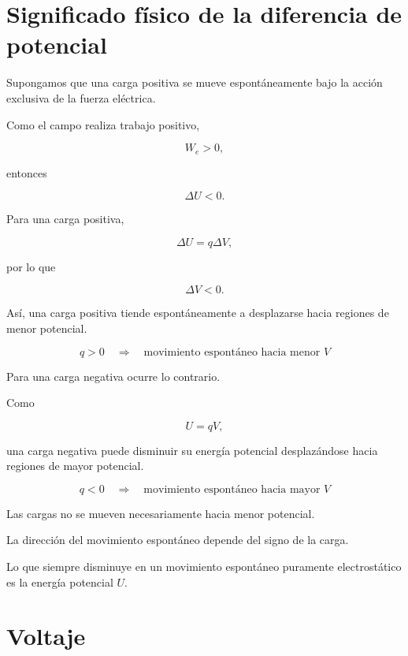 \section{Significado físico de la diferencia de potencial}

Supongamos que una carga positiva se mueve espontáneamente bajo la acción exclusiva
de la fuerza eléctrica.

Como el campo realiza trabajo positivo,

\[
W_e>0,
\]

entonces

\[
\Delta U<0.
\]

Para una carga positiva,

\[
\Delta U=q\Delta V,
\]

por lo que

\[
\Delta V<0.
\]

Así, una carga positiva tiende espontáneamente a desplazarse hacia regiones de menor
potencial.

\begin{equation}
\boxed{
q>0
\quad\Longrightarrow\quad
\text{movimiento espontáneo hacia menor }V
}
\end{equation}

Para una carga negativa ocurre lo contrario.

Como

\[
U=qV,
\]

una carga negativa puede disminuir su energía potencial desplazándose hacia regiones
de mayor potencial.

\begin{equation}
\boxed{
q<0
\quad\Longrightarrow\quad
\text{movimiento espontáneo hacia mayor }V
}
\end{equation}

\begin{advertencia}

Las cargas no se mueven necesariamente hacia menor potencial.

La dirección del movimiento espontáneo depende del signo de la carga.

Lo que siempre disminuye en un movimiento espontáneo puramente electrostático es la
energía potencial \(U\).

\end{advertencia}


\section{Voltaje}

